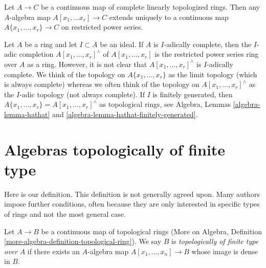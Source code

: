 \begin{remark}
\label{remark-universal-property}
\begin{reference}
\cite[Chapter 0, 7.5.3]{EGA}
\end{reference}
Let $A \to C$ be a continuous map of complete linearly topologized rings.
Then any $A$-algebra map $A[x_1, \ldots x_r] \to C$ extends uniquely to a
continuous map $A\{x_1, \ldots, x_r\} \to C$ on restricted power series.
\end{remark}

\begin{remark}
\label{remark-I-adic-completion-and-restricted-power-series}
Let $A$ be a ring and let $I \subset A$ be an ideal. If $A$ is $I$-adically
complete, then the $I$-adic completion $A[x_1, \ldots, x_r]^\wedge$ of
$A[x_1, \ldots, x_r]$ is the restricted power series ring over $A$ as a
ring. However, it is not clear that $A[x_1, \ldots, x_r]^\wedge$ is
$I$-adically complete. We think of the topology on $A\{x_1, \ldots, x_r\}$
as the limit topology (which is always complete) whereas we often think of
the topology on $A[x_1, \ldots, x_r]^\wedge$ as the $I$-adic topology
(not always complete). If $I$ is finitely generated, then
$A\{x_1, \ldots, x_r\} = A[x_1, \ldots, x_r]^\wedge$ as topological
rings, see Algebra, Lemmas \ref{algebra-lemma-hathat} and
\ref{algebra-lemma-hathat-finitely-generated}.
\end{remark}





\section{Algebras topologically of finite type}
\label{section-tft}

\noindent
Here is our definition. This definition is not generally agreed upon.
Many authors impose further conditions, often because they are only
interested in specific types of rings and not the most general case.

\begin{definition}
\label{definition-topologically-finite-type}
Let $A \to B$ be a continuous map of topological rings
(More on Algebra, Definition \ref{more-algebra-definition-topological-ring}).
We say $B$ is {\it topologically of finite type over} $A$ if
there exists an $A$-algebra map $A[x_1, \ldots, x_n] \to B$ whose
image is dense in $B$.
\end{definition}


